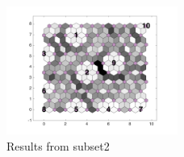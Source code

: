 \begin{figure}
        \centering
         \includegraphics[width=0.5\textwidth]{../../images0.01/M31/2D/image_subsets/subset2_dist_with_hits_t.png}
    \caption{Results from subset2}
    \label{fig: subset2}
\end{figure}
